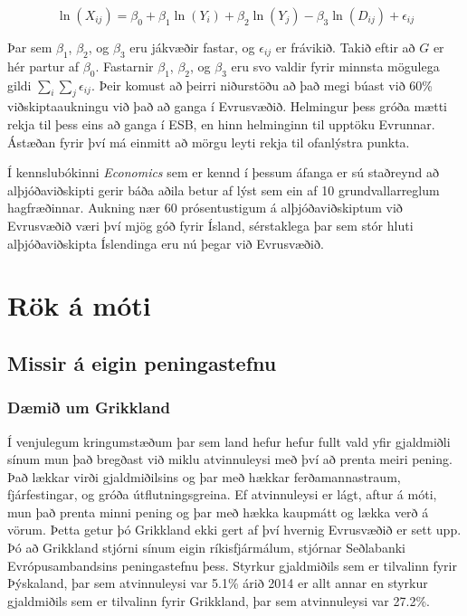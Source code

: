 \documentclass[a4paper]{article}
\begin{document}
\[\ln(X_{ij}) = \beta_{0} + \beta_{1}\ln(Y_{i}) + \beta_{2}\ln(Y_{j}) - \beta_{3}\ln(D_{ij}) + \epsilon_{ij}\]

Þar sem \(\beta_{1}\), \(\beta_{2}\), og \(\beta_{3}\) eru jákvæðir fastar, og \(\epsilon_{ij}\) er frávikið. Takið eftir að \(G\) er hér partur af \(\beta_{0}\). Fastarnir \(\beta_{1}\), \(\beta_{2}\), og \(\beta_{3}\) eru svo valdir fyrir minnsta mögulega gildi \(\sum_{i}\sum_{j}\epsilon_{ij}\).\cite{gravity_powerpoint} Þeir komust að þeirri niðurstöðu að það megi búast við 60\% viðskiptaaukningu við það að ganga í Evrusvæðið. Helmingur þess gróða mætti rekja til þess eins að ganga í ESB, en hinn helminginn til upptöku Evrunnar. Ástæðan fyrir því má einmitt að mörgu leyti rekja til ofanlýstra punkta.\cite{icb_wp_26}

Í kennslubókinni \textit{Economics} sem er kennd í þessum áfanga er sú staðreynd að alþjóðaviðskipti gerir báða aðila betur af lýst sem ein af 10 grundvallarreglum hagfræðinnar.\cite{economics} Aukning nær 60 prósentustigum á alþjóðaviðskiptum við Evrusvæðið væri því mjög góð fyrir Ísland, sérstaklega þar sem stór hluti alþjóðaviðskipta Íslendinga eru nú þegar við Evrusvæðið.\cite{hvada_gjaldmidill}

\section{Rök á móti}

\subsection{Missir á eigin peningastefnu}

\subsubsection{Dæmið um Grikkland}

Í venjulegum kringumstæðum þar sem land hefur hefur fullt vald yfir gjaldmiðli sínum mun það bregðast við miklu atvinnuleysi með því að prenta meiri pening. Það lækkar virði gjaldmiðilsins og þar með hækkar ferðamannastraum, fjárfestingar, og gróða útflutningsgreina. Ef atvinnuleysi er lágt, aftur á móti, mun það prenta minni pening og þar með hækka kaupmátt og lækka verð á vörum. Þetta getur þó Grikkland ekki gert af því hvernig Evrusvæðið er sett upp. Þó að Grikkland stjórni sínum eigin ríkisfjármálum, stjórnar Seðlabanki Evrópusambandsins peningastefnu þess.\cite{vox_greece} Styrkur gjaldmiðils sem er tilvalinn fyrir Þýskaland, þar sem atvinnuleysi var 5.1\% árið 2014 er allt annar en styrkur gjaldmiðils sem er tilvalinn fyrir Grikkland, þar sem atvinnuleysi var 27.2\%.\cite{eurostat}
\end{document}
